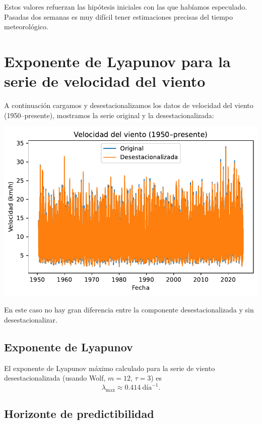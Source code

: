 \documentclass[
  10pt,
  a4paper,
  DIV=11,
  numbers=noendperiod,
  open=any]{scrreprt}
\makeatletter
\newcommand*\pandocbounded[1]{%
  \sbox\pandoc@box{#1}%
  \Gscale@div\@tempa{\textheight}{\dimexpr\ht\pandoc@box+\dp\pandoc@box\relax}%
  \Gscale@div\@tempb{\linewidth}{\wd\pandoc@box}%
  \ifdim\@tempb\p@<\@tempa\p@\let\@tempa\@tempb\fi%
  \ifdim\@tempa\p@<\p@\scalebox{\@tempa}{\usebox\pandoc@box}%
  \else\usebox{\pandoc@box}%
  \fi%
}
\numberwithin{equation}{chapter}
\numberwithin{equation}{section}
\renewcommand{\[}{\begin{equation}}
\renewcommand{\]}{\end{equation}}
\providecommand{\pandocbounded}[1]{#1}%
\renewcommand{\pandocbounded}[1]{\begingroup\centering #1\par\endgroup}
\makeatother
\begin{document}
Estos valores refuerzan las hipótesis iniciales con las que habíamos
especulado. Pasadas dos semanas es muy difícil tener estimaciones
precisas del tiempo meteorológico.

\section{Exponente de Lyapunov para la serie de velocidad del
viento}\label{exponente-de-lyapunov-para-la-serie-de-velocidad-del-viento}

A continuación cargamos y desestacionalizamos los datos de velocidad del
viento (1950--presente), mostramos la serie original y la
desestacionalizada:

\pandocbounded{\includegraphics[keepaspectratio]{03-meteorologia/calculolyapunov_files/figure-pdf/cell-5-output-1.pdf}}

En este caso no hay gran diferencia entre la componente
desestacionalizada y sin desestacionalizar.

\subsection{Exponente de Lyapunov}\label{exponente-de-lyapunov}

El exponente de Lyapunov máximo calculado para la serie de viento
desestacionalizada (usando Wolf, \(m=12\), \(\tau=3\)) es\\
\[
\lambda_{\max} \approx 0.414\ \mathrm{día}^{-1}.
\]

\subsection{Horizonte de
predictibilidad}\label{horizonte-de-predictibilidad-2}
\end{document}
